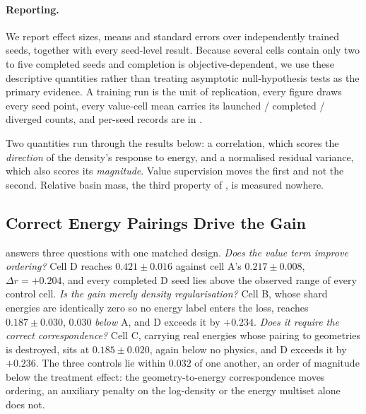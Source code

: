 \paragraph{Reporting.} We report effect sizes, means and standard errors over independently trained
seeds, together with every seed-level result. Because several cells contain only two to five
completed seeds and completion is objective-dependent, we use these descriptive quantities rather
than treating asymptotic null-hypothesis tests as the primary evidence. A training run is the unit
of replication, every figure draws every seed point, every value-cell mean carries its launched /
completed / diverged counts, and per-seed records are in .

Two quantities run through the results below: a correlation, which scores the \emph{direction} of the
density's response to energy, and a normalised residual variance, which also scores its
\emph{magnitude}. Value supervision moves the first and not the second. Relative basin mass, the
third property of , is measured nowhere.

\subsection{Correct Energy Pairings Drive the Gain}
\label{sec:ablation}
\label{sec:negative}

 answers three questions with one matched design. \emph{Does the value term improve
ordering?} Cell D reaches $0.421 \pm 0.016$ against cell A's $0.217 \pm 0.008$, $\Delta r = +0.204$,
and every completed D seed lies above the observed range of every control cell. \emph{Is the gain
merely density regularisation?} Cell B, whose shard energies are identically zero so no energy label
enters the loss, reaches $0.187 \pm 0.030$, $0.030$ \emph{below} A, and D exceeds it by $+0.234$.
\emph{Does it require the correct correspondence?} Cell C, carrying real energies whose pairing to
geometries is destroyed, sits at $0.185 \pm 0.020$, again below no physics, and D exceeds it by
$+0.236$. The three controls lie within $0.032$ of one another, an order of magnitude below the
treatment effect: the geometry-to-energy correspondence moves ordering, an auxiliary penalty on the
log-density or the energy multiset alone does not.



